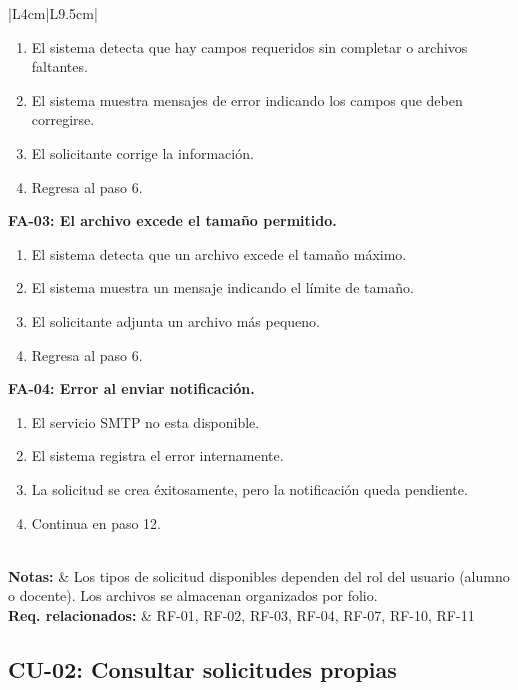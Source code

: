 \begin{longtable}{|L{4cm}|L{9.5cm}|}
\begin{enumerate}[nosep, leftmargin=*]
        \item[7.1] El sistema detecta que hay campos requeridos sin completar o archivos faltantes.
        \item[7.2] El sistema muestra mensajes de error indicando los campos que deben corregirse.
        \item[7.3] El solicitante corrige la información.
        \item[7.4] Regresa al paso 6.
    \end{enumerate}
    \vspace{0.2cm}
    \textbf{FA-03: El archivo excede el tamaño permitido.}
    \begin{enumerate}[nosep, leftmargin=*]
        \item[7.1] El sistema detecta que un archivo excede el tamaño máximo.
        \item[7.2] El sistema muestra un mensaje indicando el límite de tamaño.
        \item[7.3] El solicitante adjunta un archivo más pequeno.
        \item[7.4] Regresa al paso 6.
    \end{enumerate}
    \vspace{0.2cm}
    \textbf{FA-04: Error al enviar notificación.}
    \begin{enumerate}[nosep, leftmargin=*]
        \item[11.1] El servicio SMTP no esta disponible.
        \item[11.2] El sistema registra el error internamente.
        \item[11.3] La solicitud se crea éxitosamente, pero la notificación queda pendiente.
        \item[11.4] Continua en paso 12.
    \end{enumerate} \\
    \hline
    \textbf{Notas:} & Los tipos de solicitud disponibles dependen del rol del usuario (alumno o docente). Los archivos se almacenan organizados por folio. \\
    \hline
    \textbf{Req. relacionados:} & RF-01, RF-02, RF-03, RF-04, RF-07, RF-10, RF-11 \\
    \hline
\end{longtable}

\subsection{CU-02: Consultar solicitudes propias}

